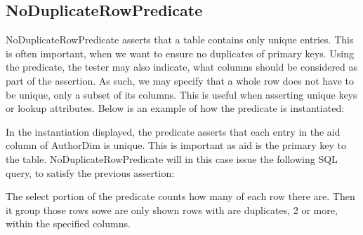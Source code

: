 \subsection{NoDuplicateRowPredicate}
NoDuplicateRowPredicate asserts that a table contains only unique entries. This is often important, when we want to ensure no duplicates of primary keys. Using the predicate, the tester may also indicate, what columns should be considered as part of the assertion. As such, we may specify that a whole row does not have to be unique, only a subset of its columns. This is useful when asserting unique keys or lookup attributes. Below is an example of how the predicate is instantiated:

In the instantiation displayed, the predicate asserts that  each entry in the aid column of AuthorDim is unique. This is important as aid is the primary key to the table. 
NoDuplicateRowPredicate will in this case issue the following SQL query, to satisfy the previous assertion:


The select portion of the predicate counts how many of each row there are. Then it group those rows sowe are only shown rows with are duplicates, 2 or more, within the specified columns.

